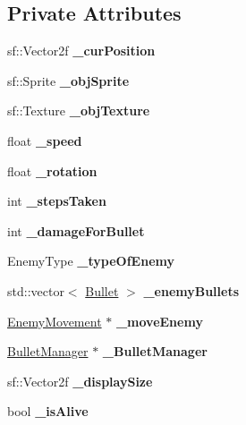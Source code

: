 \subsection*{Private Attributes}
\begin{DoxyCompactItemize}
\item 
\mbox{\label{class_enemy_aefebf6e5fb323b9b27510c26707d0013}} 
sf\+::\+Vector2f {\bfseries \+\_\+cur\+Position}
\item 
\mbox{\label{class_enemy_a299e3bbee6558cad0e9cd5dc510341a7}} 
sf\+::\+Sprite {\bfseries \+\_\+obj\+Sprite}
\item 
\mbox{\label{class_enemy_a9bfc9a676333f13aa3bc87dbabc036b5}} 
sf\+::\+Texture {\bfseries \+\_\+obj\+Texture}
\item 
\mbox{\label{class_enemy_a5ad8a827b28dd24331a434d1993d5c01}} 
float {\bfseries \+\_\+speed}
\item 
\mbox{\label{class_enemy_ad00fabd2ca45f308cf3b0ead95c9bb82}} 
float {\bfseries \+\_\+rotation}
\item 
\mbox{\label{class_enemy_a6c795cbaf685c2b4824601219c39192b}} 
int {\bfseries \+\_\+steps\+Taken}
\item 
\mbox{\label{class_enemy_af922f36da4c166ab18091c297f7faa0e}} 
int {\bfseries \+\_\+damage\+For\+Bullet}
\item 
\mbox{\label{class_enemy_a28e9fad6f896986b88f53895f6bba866}} 
Enemy\+Type {\bfseries \+\_\+type\+Of\+Enemy}
\item 
\mbox{\label{class_enemy_ab0fb1cab49fa8580cd6ba8ce3d70b32e}} 
std\+::vector$<$ \hyperlink{class_bullet}{Bullet} $>$ {\bfseries \+\_\+enemy\+Bullets}
\item 
\mbox{\label{class_enemy_a3a0b038e3f79797e8e1ef32b1ec441e0}} 
\hyperlink{class_enemy_movement}{Enemy\+Movement} $\ast$ {\bfseries \+\_\+move\+Enemy}
\item 
\mbox{\label{class_enemy_a5f5dbc651e786307c64b99b6a4219f99}} 
\hyperlink{class_bullet_manager}{Bullet\+Manager} $\ast$ {\bfseries \+\_\+\+Bullet\+Manager}
\item 
\mbox{\label{class_enemy_a27fcc8bffa13feb1097d41f4fa0532f8}} 
sf\+::\+Vector2f {\bfseries \+\_\+display\+Size}
\item 
\mbox{\label{class_enemy_ae9c6779193a20e666d0d1ec4091d35d9}} 
bool {\bfseries \+\_\+is\+Alive}
\end{DoxyCompactItemize}
